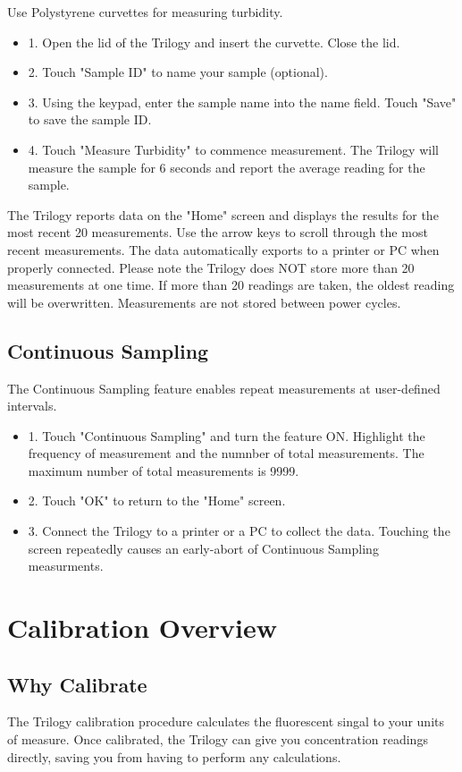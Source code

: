 \documentclass[12pt]{../SOP3_beta}\usepackage[]{graphicx}\usepackage[]{color}
\begin{document}
\NP Use Polystyrene curvettes for measuring turbidity.
\begin{itemize}
  \item 1. Open the lid of the Trilogy and insert the curvette. Close the lid.
  \item 2. Touch "Sample ID" to name your sample (optional).
  \item 3. Using the keypad, enter the sample name into the name field. Touch "Save" to save the sample ID.
  \item 4. Touch "Measure Turbidity" to commence measurement. The Trilogy will measure the sample for 6 seconds and report the average reading for the sample. 
\end{itemize}

\NP The Trilogy reports data on the "Home" screen and displays the results for the most recent 20 measurements. Use the arrow keys to scroll through the most recent measurements. The data automatically exports to a printer or PC when properly connected. Please note the Trilogy does NOT store more than 20 measurements at one time. If more than 20 readings are taken, the oldest reading will be overwritten. Measurements are not stored between power cycles.

\subsection{Continuous Sampling}
\NP The Continuous Sampling feature enables repeat measurements at user-defined intervals.
\begin{itemize}
  \item 1. Touch "Continuous Sampling" and turn the feature ON. Highlight the frequency of measurement and the numnber of total measurements. The maximum number of total measurements is 9999.
  \item 2. Touch "OK" to return to the "Home" screen.
  \item 3. Connect the Trilogy to a printer or a PC to collect the data. Touching the screen repeatedly causes an early-abort of Continuous Sampling measurments. 
\end{itemize}

\section{Calibration Overview}
\subsection{Why Calibrate}
\NP The Trilogy calibration procedure calculates the fluorescent singal to your units of measure. Once calibrated, the Trilogy can give you concentration readings directly, saving you from having to perform any calculations. 
\end{document}
